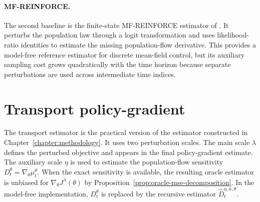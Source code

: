 \paragraph{MF-REINFORCE.}
The second baseline is the finite-state MF-REINFORCE estimator of \cite{meunier2026model}. It perturbs the population law through a logit transformation and uses likelihood-ratio identities to estimate the missing population-flow derivative. This provides a model-free reference estimator for discrete mean-field control, but its auxiliary sampling cost grows quadratically with the time horizon because separate perturbations are used across intermediate time indices.

\section{Transport policy-gradient}

The transport estimator is the practical version of the estimator constructed in Chapter~\ref{chapter:methodology}. It uses two perturbation scales. The main scale $\lambda$ defines the perturbed objective and appears in the final policy-gradient estimate. The auxiliary scale $\eta$ is used to estimate the population-flow sensitivity $D_t^\theta=\nabla_\theta\mu_t^\theta$. When the exact sensitivity is available, the resulting oracle estimator is unbiased for $\nabla_\theta J^\lambda(\theta)$ by Proposition~\ref{prop:oracle-mse-decomposition}. In the model-free implementation, $D_t^\theta$ is replaced by the recursive estimator $\widehat D_t^{\eta,n,\theta}$.

